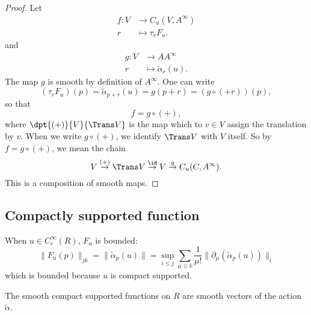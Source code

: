 \begin{proof}
Let 
		\begin{equation}
		\begin{aligned}
			 f  \colon V &\to C_u(V,A^{\infty})\\
			r&\mapsto \tau_rF_u.
		\end{aligned}
	\end{equation}
and 
		\begin{equation}
		\begin{aligned}
			 g  \colon V &\to A A^{\infty}\\
			r&\mapsto \tilde\alpha_r(u).
		\end{aligned}
	\end{equation}
The map $g$ is smooth by definition of $A^{\infty}$. One can write 
\begin{equation}
(\tau_rF_u)(p)=\tilde\alpha_{p+r}(u)
		=g(p+r)
		=(g\circ (+r))(p),
\end{equation}
so that 
\[ 
  f=g\circ(+),
\]
where $\dpt{ (+) }{ V }{ \Trans V }$ is the map which to $v\in V$ assign the translation by $v$. When we write $g\circ(+)$, we identify $\Trans V$ with $V$ itself. So by $f=g\circ(+)$, we mean the chain
\[ 
  V  \stackrel{(+)}{\to}  \Trans V\stackrel{\id}{\to} V\stackrel{g}{\to}C_u(C,A^{\infty}).
\]
This is a composition of smooth maps.


\end{proof}


\subsection{Compactly supported function}

When $u\in C_c^{\infty}(R)$, $F_u$ is bounded:
\[ 
  \| F_u(p) \|_{jk}=\| \tilde\alpha_p(u) \|=\sup_{i\leq j}\sum _{\mu\leq k}\frac{1}{ \mu! }\| \partial_{\mu}(\tilde\alpha_p(u)) \|_i
\]
which is bounded because $u$ is compact supported. 

\begin{proposition}
The smooth compact supported functions on $R$ are smooth vectors of the action $\tilde\alpha$.
\end{proposition}

